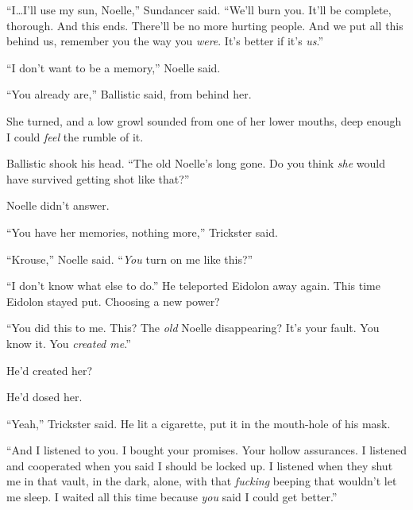 ``I\ldots I'll use my sun, Noelle,'' Sundancer said.  ``We'll burn you.  It'll be complete, thorough.  And this ends.  There'll be no more hurting people.  And we put all this behind us, remember you the way you \emph{were}.  It's better if it's \emph{us}.''



``I don't want to be a memory,'' Noelle said.



``You already are,'' Ballistic said, from behind her.



She turned, and a low growl sounded from one of her lower mouths, deep enough I could \emph{feel} the rumble of it.



Ballistic shook his head.  ``The old Noelle's long gone.  Do you think \emph{she} would have survived getting shot like that?''



Noelle didn't answer.



``You have her memories, nothing more,'' Trickster said.



``Krouse,'' Noelle said.  ``\emph{You} turn on me like this?''



``I don't know what else to do.''  He teleported Eidolon away again.  This time Eidolon stayed put.  Choosing a new power?



``You did this to me.  This?  The \emph{old} Noelle disappearing?  It's your fault.  You know it.  You \emph{created me}.''



He'd created her?



He'd dosed her.



``Yeah,'' Trickster said.  He lit a cigarette, put it in the mouth-hole of his mask.



``And I listened to you.  I bought your promises.  Your hollow assurances.  I listened and cooperated when you said I should be locked up.  I listened when they shut me in that vault, in the dark, alone, with that \emph{fucking }beeping that wouldn't let me sleep.  I waited all this time because \emph{you} said I could get better.''



